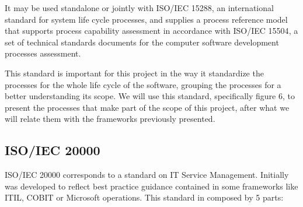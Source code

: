 It may be used standalone or jointly with ISO/IEC 15288\cite{ISO15288}, an international standard for system life cycle processes, and supplies a process reference model that supports process capability assessment in accordance with ISO/IEC 15504\cite{ISO15504}, a set of technical standards documents for the computer software development processes assessment.\par
This standard is important for this project in the way it standardize the processes for the whole life cycle of the software, grouping the processes for a better understanding its scope. We will use this standard, specifically figure 6, to present the processes that make part of the scope of this project, after what we will relate them with the frameworks previously presented. 


\subsection{ISO/IEC 20000}

ISO/IEC 20000 corresponds to a standard on IT Service Management. Initially was developed to reflect best practice guidance contained in some frameworks like ITIL, COBIT or Microsoft operations. This standard in composed by 5 parts:

